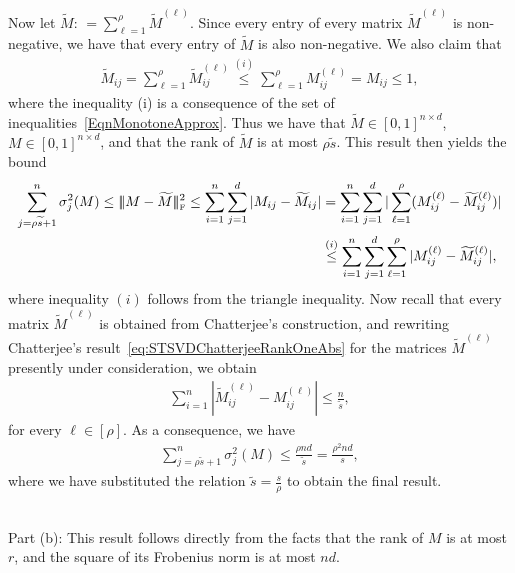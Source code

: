 \documentclass[11pt, hidelinks]{article} %
\newcommand{\matsnorm}[2]{|\!|\!| #1 | \! | \!|_{{#2}}}
\newcommand{\frobnorm}[1]{\ensuremath{\matsnorm{#1}{\mbox{\tiny{F}}}}}
\newcommand{\defn}{\ensuremath{:\,=}}
\newcommand{\numrows}{n}
\newcommand{\numcols}{d}
\newcommand{\wtmatrix}{M}
\newcommand{\wt}{\wtmatrix}
\newcommand{\nnrank}{r}
\newcommand{\permrank}{\rho}
\begin{document}
Now let $\widetilde{\wtmatrix} \defn \sum_{\ell=1}^{\permrank} \widetilde{\wtmatrix}^{(\ell)}$. Since every entry of every matrix $\widetilde{\wtmatrix}^{(\ell)}$ is non-negative, we have that every entry of $\widetilde{\wtmatrix}$ is also non-negative. We also claim that
\begin{align*}
\widetilde{\wtmatrix}_{ij} = \sum_{\ell=1}^{\permrank} \widetilde{\wtmatrix}^{(\ell)}_{ij} \stackrel{(i)}{\leq} \sum_{\ell=1}^{\permrank} {\wtmatrix}^{(\ell)}_{ij} = \wt_{ij} \leq 1,
\end{align*}
where the inequality (i) is a consequence of the set of inequalities~\eqref{EqnMonotoneApprox}. 
Thus we have that $\widetilde{\wtmatrix} \in [0,1]^{\numrows \times \numcols}$, $\wtmatrix \in [0,1]^{\numrows \times \numcols}$, and that the rank of $\widetilde{\wtmatrix}$ is at most $\permrank \widetilde{s}$. This result then yields the bound
\begin{align*}
\sum_{j=\permrank \widetilde{s} +1}^\numrows \sigma^2_j(\wt) \leq \frobnorm{ \wt - \widetilde{\wt} }^2 
%
\leq \sum_{i=1}^{\numrows} \sum_{j=1}^{\numcols} |\wt_{ij} - \widetilde{\wt}_{ij} | & =   \sum_{i=1}^{\numrows} \sum_{j=1}^{\numcols} | \sum_{\ell=1}^{\permrank} ( \wtmatrix^{(\ell)}_{ij} - \widetilde{\wtmatrix}^{(\ell)}_{ij} )| \\
%
&  \stackrel{(i)}{\leq} \sum_{i=1}^{\numrows} \sum_{j=1}^{\numcols} \sum_{\ell=1}^{\permrank} | \wtmatrix^{(\ell)}_{ij} - \widetilde{\wtmatrix}^{(\ell)}_{ij} |,
\end{align*}
where inequality $(i)$ follows from the triangle inequality. 
Now recall that every matrix $\widetilde{\wtmatrix}^{(\ell)}$ is obtained from Chatterjee's construction, and rewriting Chatterjee's result~\eqref{eq:STSVDChatterjeeRankOneAbs} for the matrices $\widetilde{\wtmatrix}^{(\ell)}$ presently under consideration, we obtain
\begin{align*}
\sum_{i=1}^\numrows | \widetilde{\wt}^{(\ell)}_{ij} - \wt^{(\ell)}_{ij}| \leq \frac{\numrows}{\widetilde{s}},
\end{align*}
for every $\ell \in [\permrank]$. 
As a consequence, we have
\begin{align*}
\sum_{j=\permrank \widetilde{s} +1}^\numrows \sigma^2_j(\wt) \leq \frac{\permrank \numrows \numcols}{\widetilde{s}} = \frac{\permrank^2 \numrows \numcols}{s},
\end{align*}
where we have substituted the relation $\widetilde{s} = \frac{s}{\permrank}$ to obtain the final result.


~\\ \noindent
Part (b): This result follows directly from the facts that the rank of $\wtmatrix$ is at most $\nnrank$, and the square of its Frobenius norm is at most $\numrows \numcols$.
\end{document}
